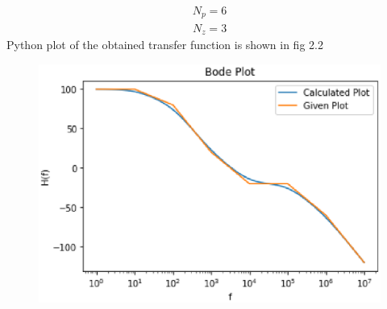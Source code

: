 \begin{enumerate}[label=\thesection.\arabic*.,ref=\thesection.\theenumi]
\begin{align}
	N_{p} = 6  
\end{align}
\begin{align}
	N_{z} = 3
\end{align}
Python plot of the obtained transfer function is shown in fig 2.2
\begin{figure}[htp]
    \centering
    \includegraphics[width=\columnwidth]{./figs/ee18btech11001/ee18btech11001_2.eps}
    \caption{}
    \label{fig:bode}
\end{figure}




\end{enumerate}
